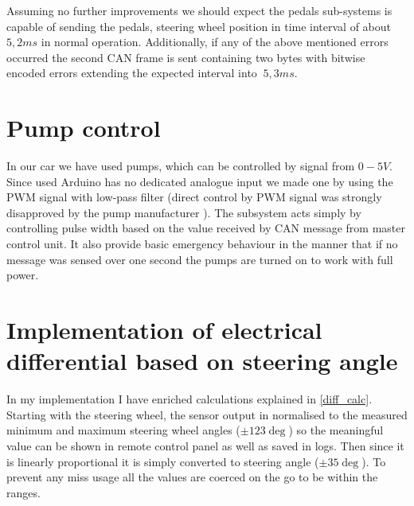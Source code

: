 Assuming no further improvements we should expect the pedals sub-systems is capable of sending the pedals, steering wheel position in time interval of about $5,2ms$\label{pedal_ideal_time} in normal operation.
Additionally, if any of the above mentioned errors occurred the second CAN frame is sent containing two bytes with bitwise encoded errors extending the expected interval into $~5,3ms$.

\section{Pump control}
In our car we have used  pumps, which can be controlled by signal from $0-5V$. Since used Arduino has no dedicated analogue input we made one by using the PWM signal with low-pass filter (direct control by PWM signal was strongly disapproved by the pump manufacturer ).
The subsystem acts simply by controlling pulse width based on the value received by CAN message from master control unit. It also provide basic emergency behaviour in the manner that if no message was sensed over one second the pumps are turned on to work with full power.






\section{Implementation of electrical differential based on steering angle}\label{diff_meth}
In my implementation I have enriched calculations explained in \ref{diff_calc}. Starting with the steering wheel, the sensor output in normalised to the measured minimum and maximum steering wheel angles ($\pm123\deg$) so the meaningful value can be shown in remote control panel as well as saved in logs. 
Then since it is linearly proportional it is simply converted to steering angle ($\pm35\deg$). To prevent any miss usage all the values are coerced on the go to be within the ranges.

